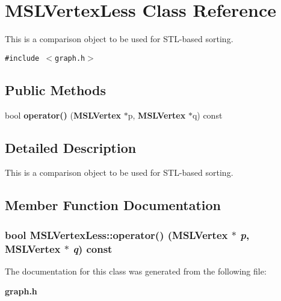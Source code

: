 \section{MSLVertex\-Less  Class Reference}
\label{class_MSLVertexLess}
This is a comparison object to be used for STL-based sorting. 


{\tt \#include $<$graph.h$>$}

\subsection*{Public Methods}
\begin{CompactItemize}
\item 
bool {\bf operator()} ({\bf MSLVertex} $\ast$p, {\bf MSLVertex} $\ast$q) const
\end{CompactItemize}


\subsection{Detailed Description}
This is a comparison object to be used for STL-based sorting.



\subsection{Member Function Documentation}
\subsubsection{\setlength{\rightskip}{0pt plus 5cm}bool MSLVertex\-Less::operator() ({\bf MSLVertex} $\ast$ {\em p}, {\bf MSLVertex} $\ast$ {\em q}) const\hspace{0.3cm}{\tt  [inline]}}\label{class_MSLVertexLess_a0}




The documentation for this class was generated from the following file:\begin{CompactItemize}
\item 
{\bf graph.h}\end{CompactItemize}
